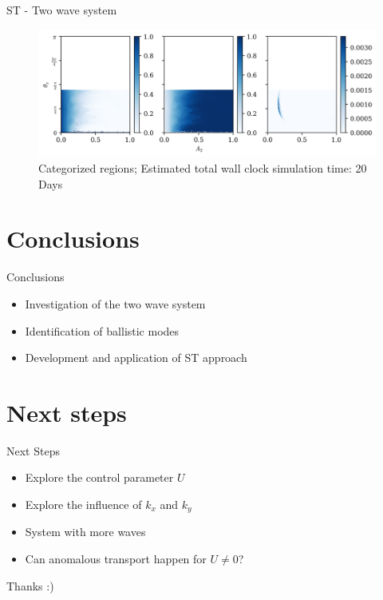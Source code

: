 \documentclass[10pt]{beamer}
\begin{document}
\begin{frame}{ST - Two wave system}
    \begin{figure}
        \includegraphics[width = \textwidth]{graf_2ondas/paramspace.png}
        \caption{Categorized regions; Estimated total wall clock simulation time: 20 Days}
    \end{figure}
\end{frame}







\section{Conclusions}

\begin{frame}{Conclusions}
\begin{itemize}
\item Investigation of the two wave system
\item Identification of ballistic modes
\item Development and application of ST approach  
\end{itemize}

\end{frame}



\section{Next steps}

\begin{frame}{Next Steps}
\begin{itemize}
\item Explore the control parameter $U$
\item Explore the influence of $k_x$ and $k_y$
\item System with more waves
\item Can anomalous transport happen for $U \neq 0$?

\end{itemize}
\end{frame}


\begin{frame}


\begin{center}
    {\huge  Thanks :)}

\end{center}



\end{frame}
\end{document}
